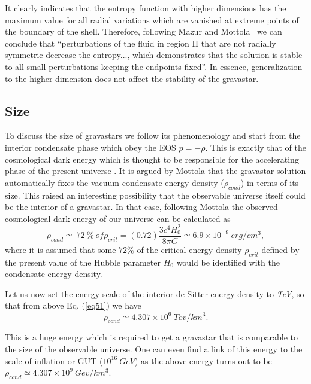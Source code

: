 \documentclass[preprint,12pt]{elsarticle}
\begin{document}
It clearly indicates that the entropy function with higher dimensions has the maximum value for all radial variations which are vanished at extreme points of the boundary of the shell. Therefore, following Mazur and Mottola~\cite{Mazur2004} we can conclude that ``perturbations of the fluid in region II that are not radially symmetric decrease the entropy..., which demonstrates that the solution is stable to all small perturbations keeping the endpoints fixed''. In essence, generalization to the higher dimension does not affect the stability of the gravastar.


\subsection{Size}
To discuss the size of gravastars we follow its phenomenology and start from the interior condensate phase which obey the EOS $p = -\rho$. This is exactly that of the cosmological dark energy which is thought to be responsible for the accelerating phase of the present universe \cite{Riess1998,Perlmutter1999}. It is argued by Mottola \cite{Mottola2001} that the gravastar solution automatically fixes the vacuum condensate energy density ($\rho_{cond}$) in terms of its size. This raised an interesting possibility that the observable universe itself could be the interior of a gravastar. In that case, following  Mottola \cite{Mottola2001} the observed cosmological dark energy of our universe can be calculated as
 \begin{equation}
\rho_{cond} \simeq \ 72\ \%\  of \rho_{crit}=(0.72) \frac{3 c^4 H_0^2}{8\pi G}\simeq 6.9\times 10^{-9}~erg/cm^3,\label{eq51}
\end{equation}
where it is assumed that some $72 \%$ of the critical energy density $\rho_{crit}$ defined by the present value of the Hubble
parameter $H_0$ would be identified with the condensate energy density.

Let us now set the energy scale of the interior de Sitter energy density to {\it TeV}, so that from above Eq. (\ref{eq51}) we have
 \begin{equation}
\rho_{cond} \simeq 4.307 \times 10^{6}~Tev/km^3.
\end{equation}

This is a huge energy which is required to get a gravastar that is comparable to the size of the observable universe. One can even find a link of this energy to the scale of inflation or GUT ($10^{16}~GeV$) as the above energy turns out to be $\rho_{cond} \simeq 4.307 \times 10^{9}~Gev/km^3$.
\end{document}
